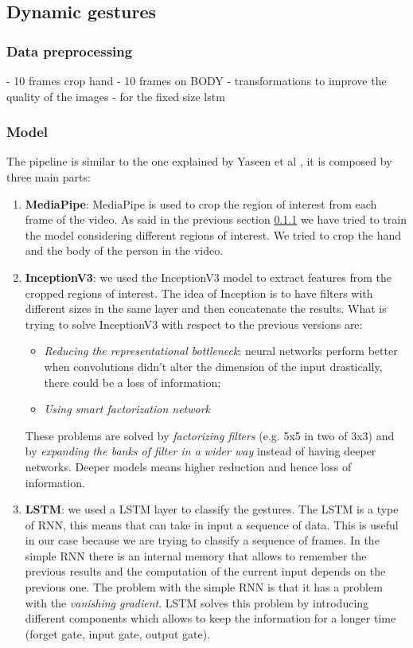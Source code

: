 \documentclass[10pt,twocolumn,letterpaper]{article}
\begin{document}
\subsection{Dynamic gestures}
\subsubsection{Data preprocessing}
\label{subsec:datapreprocessing}
- 10 frames crop hand
- 10 frames on BODY
- transformations to improve the quality of the images
- for the fixed size lstm
\subsubsection{Model}
The pipeline is similar to the one explained by Yaseen et al \cite{electronics13163233}, it is composed by three main parts:
\begin{enumerate}
   \item \textbf{MediaPipe}: MediaPipe is used to crop the region of interest from each frame of the video.
   As said in the previous section \ref{subsec:datapreprocessing} we have tried to train the model considering 
   different regions of interest. We tried to crop the hand and the body of the person in the video. 
   \item \textbf{InceptionV3}: we used the InceptionV3 model \cite{szegedy2015rethinkinginceptionarchitecturecomputer} 
   to extract features from the cropped regions of interest.
   The idea of Inception is to have filters with different sizes in the same layer and then concatenate 
   the results. What is trying to solve InceptionV3 with respect to the previous versions are:
   \begin{itemize}
      \item \textit{Reducing the representational bottleneck}: neural networks perform better when convolutions
      didn't alter the dimension of the input drastically, there could be a loss of information;
      \item \textit{Using smart factorization network}
   \end{itemize}  
   These problems are solved by \textit{factorizing filters} (e.g. 5x5 in two of 3x3) and by \textit{expanding 
   the banks of filter in a wider way} instead of having deeper networks. 
   Deeper models means higher reduction and hence loss of information.
   \item \textbf{LSTM}: we used a LSTM layer to classify the gestures. 
   The LSTM is a type of RNN, this means that can take in input a sequence of data. This is useful in our case
   because we are trying to classify a sequence of frames. In the simple RNN there is an internal memory 
   that allows to remember the previous results and the computation of the current input depends on 
   the previous one. The problem with the simple RNN is that it has a problem with the \textit{vanishing gradient}.
   LSTM solves this problem by introducing different components which allows to keep the information 
   for a longer time (forget gate, input gate, output gate).
\end{enumerate}
\end{document}
